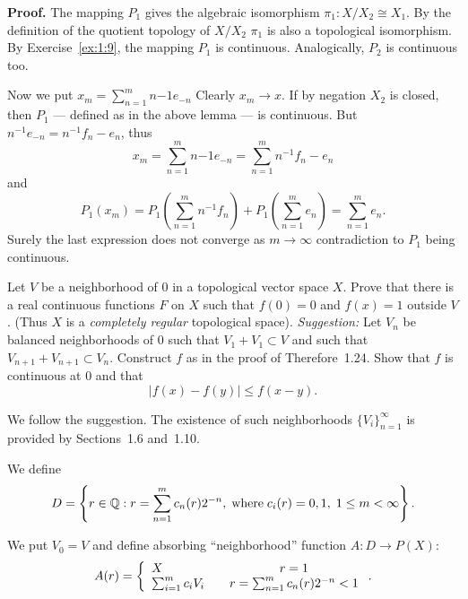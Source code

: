 \begin{enumerate}
\textbf{Proof.}
The mapping \(P_1\) gives
the algebraic isomorphism \(\pi_1: X/X_2 \cong  X_1\).
By the definition of the quotient topology of \(X/X_2\)
\(\pi_1\) is also a topological isomorphism.
By Exercise~\ref{ex:1:9}, the mapping \(P_1\) is continuous.
Analogically, \(P_2\) is continuous too.
\proofend

Now we put \(x_m = \sum_{n=1}^m n{-1}e_{-n}\)
Clearly \(x_m \rightarrow x\). If by negation \(X_2\) is closed,
then \(P_1\) --- defined as in the above lemma ---
is continuous. But \(n^{-1}e_{-n} = n^{-1}f_n - e_n\), thus
\begin{equation*}
x_m = \sum_{n=1}^m n{-1}e_{-n}
  = \sum_{n=1}^m n^{-1}f_n - e_n
\end{equation*}
and
\begin{equation*}
P_1(x_m)
  = P_1\left(\sum_{n=1}^m n^{-1}f_n \right) +
    P_1\left(\sum_{n=1}^m e_n \right) = \sum_{n=1}^m e_n.
\end{equation*}
Surely the last expression does not converge as \(m\rightarrow \infty\)
contradiction to \(P_1\) being continuous.


\begin{excopy}
Let $V$ be a neighborhood of $0$ in a topological vector space $X$.
Prove that there is a real continuous functions $F$ on $X$ such that
\(f(0) = 0\) and \(f(x)=1\) outside $V$.
(Thus $X$ is a 
\emph{completely regular} topological space).
\emph{Suggestion:} Let \(V_n\) be balanced neighborhoods of $0$ 
such that \(V_1+V_1 \subset V\) and
such that \(V_{n+1}+V_{n+1} \subset V_n\).
Construct $f$ as in the proof of Therefore~1.24.
Show that $f$ is continuous at $0$ and that
\begin{equation*}
 |f(x) - f(y)| \leq f(x-y).
\end{equation*}
\end{excopy}

We follow the suggestion. 
The existence of such neighborhoods \(\{V_i\}_{n=1}^\infty\)
is provided by \cite{RudinFA79} Sections~1.6 and~1.10.

We define 
\begin{equation*}
D = \left\{r\in \mathbb{Q}: 
      r = \sum_{n=1}^m c_n(r)2^{-n},\; \textrm{where}\;c_i(r)=0,1,\;
      1\leq m < \infty \right\}.
\end{equation*}


We put \(V_0 = V\) and define absorbing ``neighborhood'' function
\(A: D \rightarrow P(X)\):
\begin{equation*}
A(r) = \left\{\begin{array}{l@{\qquad}c}
  X & r = 1 \\
  \sum_{i=1}^m c_i V_i & r = \sum_{n=1}^m c_n(r)2^{-n} < 1
  \end{array}\right..
\end{equation*}


\end{enumerate}
